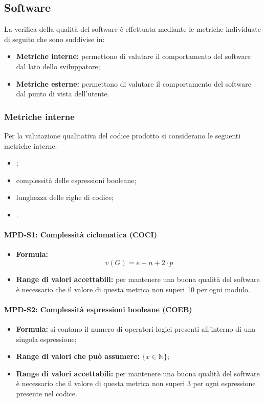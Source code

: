 \subsection{Software} \label{_metricheQualitaCodice}
La verifica della qualità del software è effettuata mediante le metriche individuate di seguito che sono suddivise in:
\begin{itemize}
    \item \textbf{Metriche interne:} permettono di valutare il comportamento del software dal lato dello sviluppatore;
    \item \textbf{Metriche esterne:} permettono di valutare il comportamento del software dal punto di vista dell'utente.
\end{itemize}

\subsubsection{Metriche interne}
Per la valutazione qualitativa del codice prodotto si considerano le seguenti metriche interne:
\begin{itemize}
    \item {};
    \item complessità delle espressioni booleane;
    \item lunghezza delle righe di codice;
    \item {}.
\end{itemize}

\paragraph{MPD-S1: Complessità ciclomatica (COCI)}
\begin{itemize}
    \item \textbf{Formula:} \[ v(G)=e-n+2\cdot p \]
    \item \textbf{Range di valori accettabili:} per mantenere una buona qualità del software è necessario che il valore di questa metrica non superi
          10 per ogni modulo.
\end{itemize}

\paragraph{MPD-S2: Complessità espressioni booleane (COEB)}
\begin{itemize}
    \item \textbf{Formula:} si contano il numero di operatori logici presenti all'interno di una singola espressione;
    \item \textbf{Range di valori che può assumere:} $\{x \in \mathbb{N} \}$;
    \item \textbf{Range di valori accettabili:} per mantenere una buona qualità del software è necessario che il valore di questa metrica non superi
          3 per ogni espressione presente nel codice.
\end{itemize}

